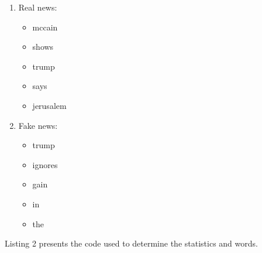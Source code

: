 \documentclass{article}
\begin{document}
\begin{enumerate}
    \item Real news:
    \begin{itemize}
        \item mccain
        \item shows
        \item trump
        \item says
        \item jerusalem
    \end{itemize}
    \item Fake news:
    \begin{itemize}
        \item trump
        \item ignores
        \item gain
        \item in
        \item the
    \end{itemize}
\end{enumerate}

Listing 2 presents the code used to determine the statistics and words.
\end{document}
